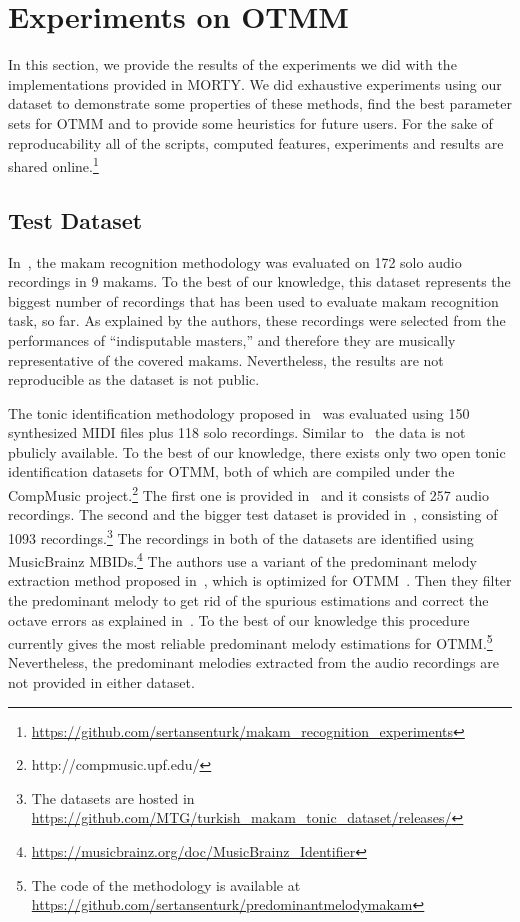 \documentclass{sig-alternate}
\begin{document}
\section{Experiments on OTMM}\label{sec:experiments}
In this section, we provide the results of the experiments we did with the implementations provided in MORTY. We did exhaustive experiments using our dataset to demonstrate some properties of these methods, find the best parameter sets for OTMM and to provide some heuristics for future users. For the sake of reproducability all of the scripts, computed features, experiments and results are shared online.\footnote{\url{https://github.com/sertansenturk/makam_recognition_experiments}}

\subsection{Test Dataset}\label{sec:dataset}

In~\cite{bozkurt_makam}, the makam recognition methodology was evaluated on 172 solo audio recordings in 9 makams. To the best of our knowledge, this dataset represents the biggest number of recordings that has been used to evaluate makam recognition task, so far. As explained by the authors, these recordings were selected from the performances of ``indisputable masters,'' and therefore they are musically representative of the covered makams. Nevertheless, the results are not reproducible as the dataset is not public. 

The tonic identification methodology proposed in~\cite{bozkurt_tonic} was evaluated using 150 synthesized MIDI files plus 118 solo recordings. Similar to~\cite{bozkurt_makam} the data is not pbulicly available. To the best of our knowledge, there exists only two open tonic identification datasets for OTMM, both of which are compiled under the CompMusic project.\footnote{http://compmusic.upf.edu/} The first one is provided in~\cite{senturk2013karar_ismir} and it consists of 257 audio recordings. The second and the bigger test dataset is provided in~\cite{sercan_tonic}, consisting of 1093 recordings.\footnote{The datasets are hosted in \url{https://github.com/MTG/turkish_makam_tonic_dataset/releases/}} The recordings in both of the datasets are identified using MusicBrainz MBIDs.\footnote{\url{https://musicbrainz.org/doc/MusicBrainz_Identifier}} The authors use a variant of the predominant me\-lody extraction method proposed in~\cite{salamon2012melody}, which is optimized for OTMM~\cite{atli2014makamFeature_atmm}. Then they filter the predominant melody to get rid of the spurious estimations and correct the octave errors as explained in~\cite{bozkurt_tonic}. To the best of our knowledge this procedure~\cite{atli2014makamFeature_atmm} currently gives the most reliable predominant melody estimations for OTMM.\footnote{The code of the methodology is available at \url{https://github.com/sertansenturk/predominantmelodymakam}} Nevertheless, the predominant melodies extracted from the audio recordings are not provided in either dataset.
 
\end{document}
